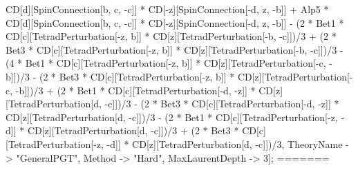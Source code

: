 CD[d][SpinConnection[b, c, -c]] * CD[-z][SpinConnection[-d, z, -b]] + Alp5 * CD[d][SpinConnection[b, c, -c]] * CD[-z][SpinConnection[-d, z, -b]] - (2 * Bet1 * CD[c][TetradPerturbation[-z, b]] * CD[z][TetradPerturbation[-b, -c]])/3 + (2 * Bet3 * CD[c][TetradPerturbation[-z, b]] * CD[z][TetradPerturbation[-b, -c]])/3 - (4 * Bet1 * CD[c][TetradPerturbation[-z, b]] * CD[z][TetradPerturbation[-c, -b]])/3 - (2 * Bet3 * CD[c][TetradPerturbation[-z, b]] * CD[z][TetradPerturbation[-c, -b]])/3 + (2 * Bet1 * CD[c][TetradPerturbation[-d, -z]] * CD[z][TetradPerturbation[d, -c]])/3 - (2 * Bet3 * CD[c][TetradPerturbation[-d, -z]] * CD[z][TetradPerturbation[d, -c]])/3 - (2 * Bet1 * CD[c][TetradPerturbation[-z, -d]] * CD[z][TetradPerturbation[d, -c]])/3 + (2 * Bet3 * CD[c][TetradPerturbation[-z, -d]] * CD[z][TetradPerturbation[d, -c]])/3, TheoryName -> "GeneralPGT", Method -> "Hard", MaxLaurentDepth -> 3]; 
=======
